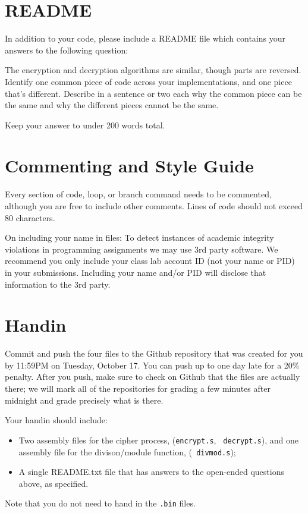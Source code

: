 \documentclass{article}
\begin{document}
\section{README}

In addition to your code, please include a README file which contains your
answers to the following question:

The encryption and decryption algorithms are similar, though parts are
reversed. Identify one common piece of code across your implementations, and
one piece that's different. Describe in a sentence or two each why the common
piece can be the same and why the different pieces cannot be the same.

Keep your answer to under 200 words total.

\section{Commenting and Style Guide}

Every section of code, loop, or branch command needs to be commented, although
you are free to include other comments. Lines of code should not exceed 80
characters.

On including your name in files: To detect instances of academic integrity
violations in programming assignments we may use 3rd party software.  We
recommend you only include your class lab account ID (not your name or PID) in
your submissions.  Including your name and/or PID will disclose that
information to the 3rd party.

\section{Handin}

Commit and push the four files to the Github repository that was created
for you by 11:59PM on Tuesday, October 17. You can push up to one day late for
a 20\% penalty. After you push, make sure to check on Github that the files are
actually there; we will mark all of the repositories for grading a few minutes
after midnight and grade precisely what is there.

Your handin should include:

\begin{itemize}
\item Two assembly files for the cipher process, ({\tt encrypt.s}, {\tt 
decrypt.s}), and one assembly file for the divison/module function, ({\tt 
divmod.s}); 
\item A single README.txt file that has answers to the open-ended questions
above, as specified.
\end{itemize}

Note that you do not need to hand in the {\tt .bin} files.
\end{document}
